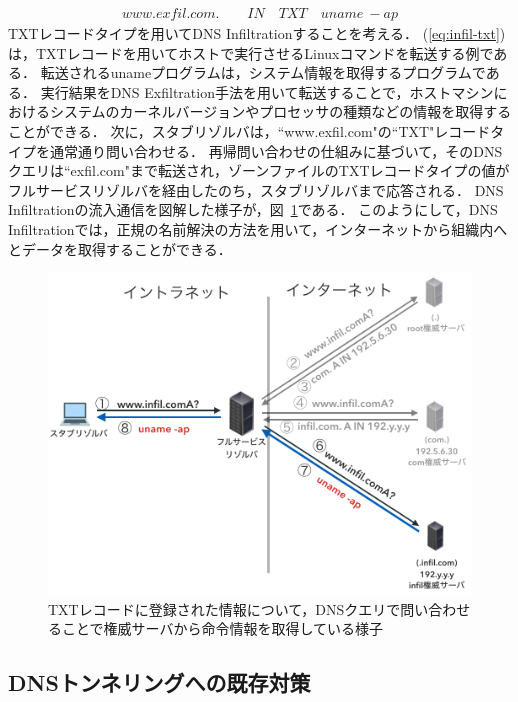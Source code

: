 \begin{eqnarray}
 www.exfil.com. \qquad IN \quad TXT \quad uname \ -ap
 \label{eq:infil-txt}
\end{eqnarray}
TXTレコードタイプを用いてDNS Infiltrationすることを考える．
(\ref{eq:infil-txt})は，TXTレコードを用いてホストで実行させるLinuxコマンドを転送する例である．
転送されるunameプログラムは，システム情報を取得するプログラムである．
実行結果をDNS Exfiltration手法を用いて転送することで，ホストマシンにおけるシステムのカーネルバージョンやプロセッサの種類などの情報を取得することができる．
次に，スタブリゾルバは，``www.exfil.com"の``TXT"レコードタイプを通常通り問い合わせる．
再帰問い合わせの仕組みに基づいて，そのDNSクエリは``exfil.com"まで転送され，ゾーンファイルのTXTレコードタイプの値がフルサービスリゾルバを経由したのち，スタブリゾルバまで応答される．
DNS Infiltrationの流入通信を図解した様子が，図~\ref{fig:dns-infiltration}である．
このようにして，DNS Infiltrationでは，正規の名前解決の方法を用いて，インターネットから組織内へとデータを取得することができる．
\begin{figure}[htbp]
 \centering
 \includegraphics[scale=0.6]{figure/dns-infiltration.png}
 \caption[DNS Infiltrationの概略図]{TXTレコードに登録された情報について，DNSクエリで問い合わせることで権威サーバから命令情報を取得している様子}
 \label{fig:dns-infiltration}
\end{figure}



\newpage
\subsection{DNSトンネリングへの既存対策}

